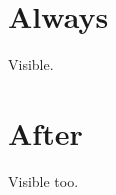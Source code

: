 \hypertarget{always}{%
\section{Always}\label{always}}

Visible.

\hypertarget{after}{%
\section{After}\label{after}}

Visible too.
